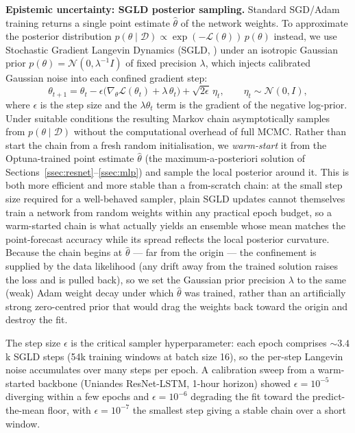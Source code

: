\textbf{Epistemic uncertainty: SGLD posterior sampling.}
Standard SGD/Adam training returns a single point estimate $\hat\theta$ of
the network weights. To approximate the posterior distribution
$p(\theta \mid \mathcal{D}) \propto \exp(-\mathcal{L}(\theta))\,p(\theta)$
instead, we use Stochastic Gradient Langevin Dynamics (SGLD,
\cite{welling2011}) under an isotropic Gaussian prior
$p(\theta) = \mathcal{N}(0, \lambda^{-1}I)$ of fixed precision $\lambda$,
which injects calibrated Gaussian noise into each confined gradient step:
\begin{equation}
  \theta_{t+1} = \theta_t - \epsilon \bigl(\nabla_\theta \mathcal{L}(\theta_t)
  + \lambda\,\theta_t\bigr) + \sqrt{2\epsilon}\,\eta_t, \qquad
  \eta_t \sim \mathcal{N}(0, I),
  \label{eq:sgld}
\end{equation}
where $\epsilon$ is the step size and the $\lambda\theta_t$ term is the
gradient of the negative log-prior. Under suitable conditions the resulting
Markov chain asymptotically samples from $p(\theta \mid \mathcal{D})$ without
the computational overhead of full MCMC. Rather than start the chain from a
fresh random initialisation, we \emph{warm-start} it from the Optuna-trained
point estimate $\hat\theta$ (the maximum-a-posteriori solution of
Sections~\ref{ssec:resnet}--\ref{ssec:mlp}) and sample the local posterior
around it. This is both more efficient and more stable than a from-scratch
chain: at the small step size required for a well-behaved sampler, plain
SGLD updates cannot themselves train a network from random weights within any
practical epoch budget, so a warm-started chain is what actually yields an
ensemble whose mean matches the point-forecast accuracy while its spread
reflects the local posterior curvature. Because the chain begins at
$\hat\theta$ --- far from the origin --- the confinement is supplied by the
data likelihood (any drift away from the trained solution raises the loss and
is pulled back), so we set the Gaussian prior precision $\lambda$ to the same
(weak) Adam weight decay under which $\hat\theta$ was trained, rather than an
artificially strong zero-centred prior that would drag the weights back
toward the origin and destroy the fit.

The step size $\epsilon$ is the critical sampler hyperparameter: each epoch
comprises ${\sim}3.4$k SGLD steps (54k training windows at batch size 16), so
the per-step Langevin noise accumulates over many steps per epoch. A
calibration sweep from a warm-started backbone (Uniandes ResNet-LSTM, 1-hour
horizon) showed $\epsilon = 10^{-5}$ diverging within a few epochs and
$\epsilon = 10^{-6}$ degrading the fit toward the predict-the-mean floor,
with $\epsilon = 10^{-7}$ the smallest step giving a stable chain over a
short window.

